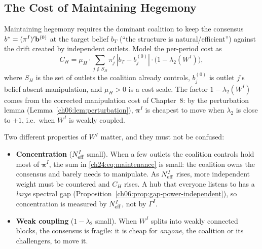 \documentclass[../structural_economics_book.tex]{subfiles}
\begin{document}
\subsection{The Cost of Maintaining Hegemony}

\begin{definition}\label{ch24:prop:maintenance}
Maintaining hegemony requires the dominant coalition to keep the consensus $b^* = (\pi^I)'\mathbf{b}^{(0)}$ at the target belief $b_T$ (``the structure is natural/efficient'') against the drift created by independent outlets. Model the per-period cost as
\begin{equation}\label{ch24:eq:maintenance}
C_H = \mu_H \cdot \sum_{j \notin S_H} \pi^I_j\,|b_T - b^{(0)}_j| \cdot \bigl(1 - \lambda_2(W^I)\bigr),
\end{equation}
where $S_H$ is the set of outlets the coalition already controls, $b^{(0)}_j$ is outlet $j$'s belief absent manipulation, and $\mu_H > 0$ is a cost scale. The factor $1 - \lambda_2(W^I)$ comes from the corrected manipulation cost of Chapter~8: by the perturbation lemma (Lemma~\ref{ch06:lem:perturbation}), $\boldsymbol{\pi}^I$ is cheapest to move when $\lambda_2$ is close to $+1$, i.e.\ when $W^I$ is weakly coupled.
\end{definition}

Two different properties of $W^I$ matter, and they must not be confused:
\begin{itemize}
\item \textbf{Concentration} ($N_{\text{eff}}^I$ small). When a few outlets the coalition controls hold most of $\boldsymbol{\pi}^I$, the sum in \eqref{ch24:eq:maintenance} is small: the coalition owns the consensus and barely needs to manipulate. As $N_{\text{eff}}^I$ rises, more independent weight must be countered and $C_H$ rises. A hub that everyone listens to has a \emph{large} spectral gap (Proposition~\ref{ch06:prop:gap-power-independent}), so concentration is measured by $N_{\text{eff}}^I$, not by $\Gamma^I$.
\item \textbf{Weak coupling} ($1-\lambda_2$ small). When $W^I$ splits into weakly connected blocks, the consensus is fragile: it is cheap for \emph{anyone}, the coalition or its challengers, to move it.
\end{itemize}
\end{document}
